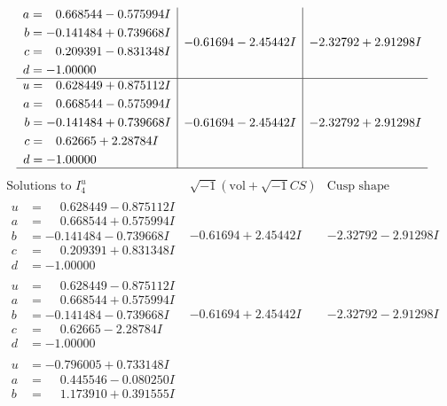 \documentclass[1p]{elsarticle_modified}
\theoremstyle{definition}
\newcommand{\I}{\sqrt{-1}}
\begin{document}
$$\begin{array}{c|c|c}
\begin{aligned}
a &= \phantom{-}0.668544 - 0.575994 I \\
b &= -0.141484 + 0.739668 I \\
c &= \phantom{-}0.209391 - 0.831348 I \\
d &= -1.00000\phantom{ +0.000000I}\end{aligned}
 & -0.61694 - 2.45442 I & -2.32792 + 2.91298 I \\ \hline\begin{aligned}
u &= \phantom{-}0.628449 + 0.875112 I \\
a &= \phantom{-}0.668544 - 0.575994 I \\
b &= -0.141484 + 0.739668 I \\
c &= \phantom{-}0.62665 + 2.28784 I \\
d &= -1.00000\phantom{ +0.000000I}\end{aligned}
 & -0.61694 - 2.45442 I & -2.32792 + 2.91298 I\\
 \hline 
 \end{array}$$\newpage$$\begin{array}{c|c|c}  
\text{Solutions to }I^u_{4}& \I (\text{vol} + \sqrt{-1}CS) & \text{Cusp shape}\\
 \hline 
\begin{aligned}
u &= \phantom{-}0.628449 - 0.875112 I \\
a &= \phantom{-}0.668544 + 0.575994 I \\
b &= -0.141484 - 0.739668 I \\
c &= \phantom{-}0.209391 + 0.831348 I \\
d &= -1.00000\phantom{ +0.000000I}\end{aligned}
 & -0.61694 + 2.45442 I & -2.32792 - 2.91298 I \\ \hline\begin{aligned}
u &= \phantom{-}0.628449 - 0.875112 I \\
a &= \phantom{-}0.668544 + 0.575994 I \\
b &= -0.141484 - 0.739668 I \\
c &= \phantom{-}0.62665 - 2.28784 I \\
d &= -1.00000\phantom{ +0.000000I}\end{aligned}
 & -0.61694 + 2.45442 I & -2.32792 - 2.91298 I \\ \hline\begin{aligned}
u &= -0.796005 + 0.733148 I \\
a &= \phantom{-}0.445546 - 0.080250 I \\
b &= \phantom{-}1.173910 + 0.391555 I \\

\end{aligned}
\end{array}$$
\end{document}
